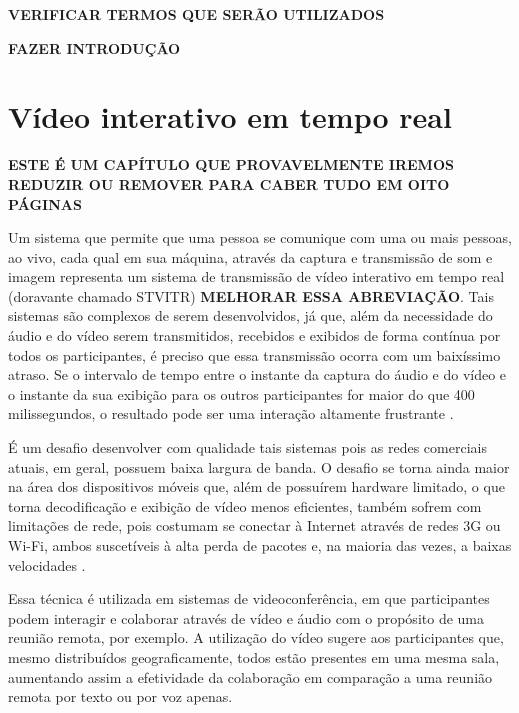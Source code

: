 \documentclass{acm_proc_article-sp}
\newcommand{\todo}[1]{\textcolor[rgb]{1.00,0.00,0.00}{\bf \uppercase{#1}}}
\begin{document}
\todo{verificar termos que serão utilizados}

\todo{fazer introdução}

\section{Vídeo interativo em tempo real}

\todo{este é um capítulo que provavelmente iremos reduzir ou remover para caber tudo em oito páginas}

Um sistema que permite que uma pessoa se comunique com uma ou mais pessoas, ao vivo, cada qual em sua máquina, através da captura e transmissão de som e imagem representa um sistema de transmissão de vídeo interativo em tempo real (doravante chamado STVITR) \todo{melhorar essa abreviação}. Tais sistemas são complexos de serem desenvolvidos, já que, além da necessidade do áudio e do vídeo serem transmitidos, recebidos e exibidos de forma contínua por todos os participantes, é preciso que essa transmissão ocorra com um baixíssimo atraso. Se o intervalo de tempo entre o instante da captura do áudio e do vídeo e o instante da sua exibição para os outros participantes for maior do que 400 milissegundos, o resultado pode ser uma interação altamente frustrante \cite{kurose_2001}.

É um desafio desenvolver com qualidade tais sistemas pois as redes comerciais atuais, em geral, possuem baixa largura de banda. O desafio se torna ainda maior na área dos dispositivos móveis que, além de possuírem hardware limitado, o que torna decodificação e exibição de vídeo menos eficientes, também sofrem com limitações de rede, pois costumam se conectar à Internet através de redes 3G ou Wi-Fi, ambos suscetíveis à alta perda de pacotes e, na maioria das vezes, a baixas velocidades \cite{huynh-thu_2008}.

Essa técnica é utilizada em sistemas de videoconferência, em que participantes podem interagir e colaborar através de vídeo e áudio com o propósito de uma reunião remota, por exemplo. A utilização do vídeo sugere aos participantes que, mesmo distribuídos geograficamente, todos estão presentes em uma mesma sala, aumentando assim a efetividade da colaboração em comparação a uma reunião remota por texto ou por voz apenas.
\end{document}
